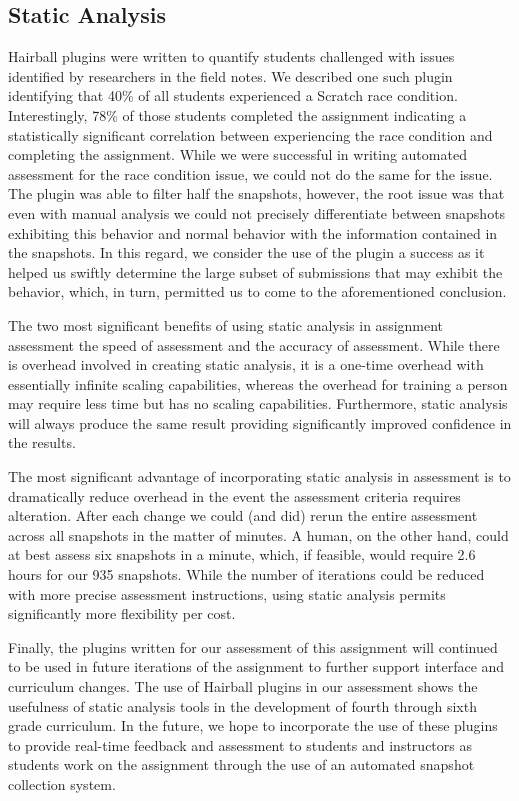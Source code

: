 \subsection{Static Analysis}
Hairball plugins were written to quantify students challenged with issues
identified by researchers in the field notes. We described one such plugin
identifying that 40\% of all students experienced a Scratch race
condition. Interestingly, 78\% of those students completed the assignment
indicating a statistically significant correlation between experiencing the
race condition and completing the assignment. While we were successful in
writing automated assessment for the race condition issue, we could not do the
same for the \dce{} issue. The plugin was able to filter half the snapshots,
however, the root issue was that even with manual analysis we could not
precisely differentiate between snapshots exhibiting this behavior and normal
behavior with the information contained in the snapshots. In this regard, we
consider the use of the plugin a success as it helped us swiftly determine the
large subset of submissions that may exhibit the behavior, which, in turn,
permitted us to come to the aforementioned conclusion.

The two most significant benefits of using static analysis in assignment
assessment the speed of assessment and the accuracy of assessment. While there
is overhead involved in creating static analysis, it is a one-time overhead
with essentially infinite scaling capabilities, whereas the overhead for
training a person may require less time but has no scaling
capabilities. Furthermore, static analysis will always produce the same result
providing significantly improved confidence in the results.

The most significant advantage of incorporating static analysis in
assessment is to dramatically reduce overhead in the event the assessment
criteria requires alteration. After each change we could (and did) rerun the
entire assessment across all snapshots in the matter of minutes. A human, on
the other hand, could at best assess six snapshots in a minute, which, if
feasible, would require 2.6 hours for our 935 snapshots. While the number of
iterations could be reduced with more precise assessment instructions, using
static analysis permits significantly more flexibility per cost.

Finally, the plugins written for our assessment of this assignment will
continued to be used in future iterations of the assignment to further support
interface and curriculum changes. The use of Hairball plugins in our assessment
shows the usefulness of static analysis tools in the development of fourth
through sixth grade curriculum. In the future, we hope to incorporate the use
of these plugins to provide real-time feedback and assessment to students and
instructors as students work on the assignment through the use of an automated
snapshot collection system.
